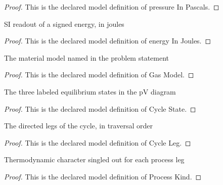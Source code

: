 \begin{proof}
  This is the declared model definition of pressure In Pascals.
\end{proof}
\begin{definition}
  \label{def:physics:phyx-mini-0352:phyxminiproblems-problemphyxmini0352-energyinjoules}
  SI readout of a signed energy, in joules
\end{definition}
\begin{proof}
  This is the declared model definition of energy In Joules.
\end{proof}
\begin{definition}
  \label{def:physics:phyx-mini-0352:phyxminiproblems-problemphyxmini0352-gasmodel}
  The material model named in the problem statement
\end{definition}
\begin{proof}
  This is the declared model definition of Gas Model.
\end{proof}
\begin{definition}
  \label{def:physics:phyx-mini-0352:phyxminiproblems-problemphyxmini0352-cyclestate}
  The three labeled equilibrium states in the pV diagram
\end{definition}
\begin{proof}
  This is the declared model definition of Cycle State.
\end{proof}
\begin{definition}
  \label{def:physics:phyx-mini-0352:phyxminiproblems-problemphyxmini0352-cycleleg}
  The directed legs of the cycle, in traversal order
\end{definition}
\begin{proof}
  This is the declared model definition of Cycle Leg.
\end{proof}
\begin{definition}
  \label{def:physics:phyx-mini-0352:phyxminiproblems-problemphyxmini0352-processkind}
  Thermodynamic character singled out for each process leg
\end{definition}
\begin{proof}
  This is the declared model definition of Process Kind.
\end{proof}
